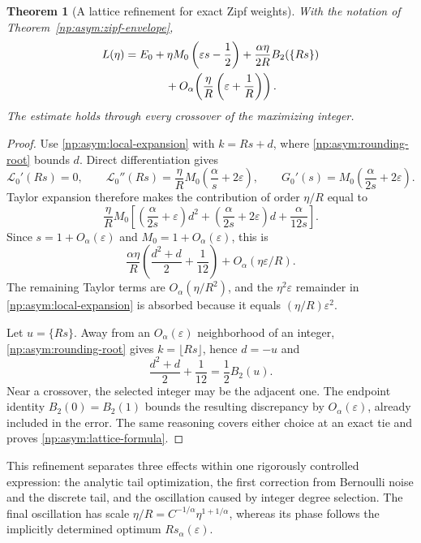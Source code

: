 \documentclass[11pt,a4paper]{article}
\newtheorem{theorem}{Theorem}[section]
\theoremstyle{definition}
\theoremstyle{remark}
\begin{document}
\begin{theorem}[A lattice refinement for exact Zipf weights]
\label{np:asym:lattice-theorem}
With the notation of Theorem~\ref{np:asym:zipf-envelope},
\begin{align}
 L(\eta)={}&E_0+\eta M_0\left(\varepsilon s-\frac12\right)
          +\frac{\alpha\eta}{2R}B_2(\{Rs\})
 \nonumber\\
 &\hspace{8mm}
       +O_\alpha\!\left(\frac\eta R
                                  \left(\varepsilon+\frac1R\right)\right).
 \label{np:asym:lattice-formula}
\end{align}
The estimate holds through every crossover of the maximizing integer.
\end{theorem}

\begin{proof}
Use \eqref{np:asym:local-expansion} with $k=Rs+d$,
where \eqref{np:asym:rounding-root} bounds $d$.
Direct differentiation gives
\[
 \mathcal L_0'(Rs)=0,\qquad
 \mathcal L_0''(Rs)=\frac\eta R M_0
                                    \left(\frac\alpha s+2\varepsilon\right),
 \qquad
 G_0'(s)=M_0\left(\frac\alpha{2s}+2\varepsilon\right).
\]
Taylor expansion therefore makes the contribution of order $\eta/R$
equal to
\[
 \frac\eta R M_0\left[
       \left(\frac\alpha{2s}+\varepsilon\right)d^2
       +\left(\frac\alpha{2s}+2\varepsilon\right)d
       +\frac\alpha{12s}\right].
\]
Since $s=1+O_\alpha(\varepsilon)$ and
$M_0=1+O_\alpha(\varepsilon)$, this is
\[
 \frac{\alpha\eta}{R}
          \left(\frac{d^2+d}{2}+\frac1{12}\right)
                         +O_\alpha(\eta\varepsilon/R).
\]
The remaining Taylor terms are $O_\alpha(\eta/R^2)$, and the
$\eta^2\varepsilon$ remainder in
\eqref{np:asym:local-expansion} is absorbed because it equals
$(\eta/R)\varepsilon^2$.

Let $u=\{Rs\}$.  Away from an $O_\alpha(\varepsilon)$ neighborhood
of an integer, \eqref{np:asym:rounding-root} gives
$k=\lfloor Rs\rfloor$, hence $d=-u$ and
\[
 \frac{d^2+d}{2}+\frac1{12}=\frac12 B_2(u).
\]
Near a crossover, the selected integer may be the adjacent one.
The endpoint identity $B_2(0)=B_2(1)$ bounds the resulting discrepancy
by $O_\alpha(\varepsilon)$, already included in the error.
The same reasoning covers either choice at an exact tie and proves
\eqref{np:asym:lattice-formula}.
\end{proof}

This refinement separates three effects within one rigorously controlled
expression: the analytic tail optimization, the first correction from
Bernoulli noise and the discrete tail, and the oscillation caused by
integer degree selection.  The final oscillation has scale
$\eta/R=C^{-1/\alpha}\eta^{1+1/\alpha}$, whereas its phase follows the
implicitly determined optimum $Rs_\alpha(\varepsilon)$.
\end{document}
